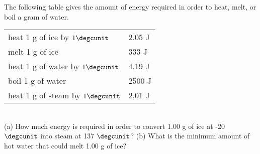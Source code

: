 The following table gives the amount of energy required in order to
        heat, melt, or boil a gram of water.\\
        \begin{tabular}{ll}
        heat 1 g of ice by $1\degcunit$        & 2.05 J\\
        melt 1 g of ice                        & 333 J\\
        heat 1 g of water by $1\degcunit$ &         4.19 J\\
        boil 1 g of water                & 2500 J\\
        heat 1 g of steam by $1\degcunit$        & 2.01 J\\
        \end{tabular}\\
        (a) How much energy is required in order to convert 1.00 g of
        ice at -20 $\degcunit$ into steam at 137 $\degcunit$? \answercheck\hwendpart
        (b) What is the minimum amount of hot water that could melt 1.00 g
        of ice? \answercheck
